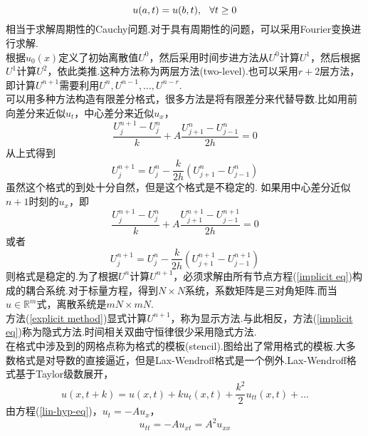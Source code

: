 \begin{equation}
	u(a,t) = u(b,t), \hspace{0.1in} \forall t \ge 0
\end{equation}
相当于求解周期性的Cauchy问题.对于具有周期性的问题，可以采用Fourier变换进行求解.\\
根据$u_0(x)$定义了初始离散值$U^0$，然后采用时间步进方法从$U^0$计算$U^1$，然后根据$U^1$计算$U^2$，依此类推.这种方法称为两层方法(two-level).也可以采用$r+2$层方法，即计算$U^{n+1}$需要利用$U^{n},U^{n-1},\ldots,U^{n-r}$.\\
可以用多种方法构造有限差分格式，很多方法是将有限差分来代替导数.比如用前向差分来近似$u_t$，中心差分来近似$u_x$，
\begin{equation} \label{Richardson scheme}
	\frac{U_{j}^{n+1} - U_{j}^{n}}{k} + A\frac{U_{j+1}^{n} - U_{j-1}^{n}}{2h} = 0
\end{equation}
从上式得到
\begin{equation} \label{explicit method}
	U_{j}^{n+1} = U_{j}^n - \frac{k}{2h}(U_{j+1}^{n} - U_{j-1}^{n})
\end{equation}
虽然这个格式的到处十分自然，但是这个格式是不稳定的.
如果用中心差分近似$n+1$时刻的$u_x$，即
\begin{equation}
\frac{U_{j}^{n+1} - U_{j}^{n}}{k} + A\frac{U_{j+1}^{n+1} - U_{j-1}^{n+1}}{2h} = 0
\end{equation}
或者
\begin{equation} \label{implicit eq}
U_{j}^{n+1} = U_{j}^n - \frac{k}{2h}(U_{j+1}^{n+1} - U_{j-1}^{n+1})
\end{equation}
则格式是稳定的.为了根据$U^n$计算$U^{n+1}$，必须求解由所有节点方程(\ref{implicit eq})构成的耦合系统.对于标量方程，得到$N\times N$系统，系数矩阵是三对角矩阵.而当$u\in \mathbb{R}^m$式，离散系统是$mN\times mN$. \\
方法(\ref{explicit method})显式计算$U^{n+1}$，称为显示方法.与此相反，方法(\ref{implicit eq})称为隐式方法.时间相关双曲守恒律很少采用隐式方法.\\
在格式中涉及到的网格点称为格式的模板(stencil).图给出了常用格式的模板.大多数格式是对导数的直接逼近，但是Lax-Wendroff格式是一个例外.Lax-Wendroff格式基于Taylor级数展开，
\begin{equation*} \label{Taylor series}
	u(x,t+k) = u(x,t) +  ku_t(x,t) + \frac{k^2}{2}u_{tt}(x,t) + \ldots 
\end{equation*}
由方程(\ref{lin-hyp-eq})，$u_t = -Au_x$，
\begin{equation} \label{utt_to_uxx}
	u_{tt} = -Au_{xt} = A^2 u_{xx} 
\end{equation}

